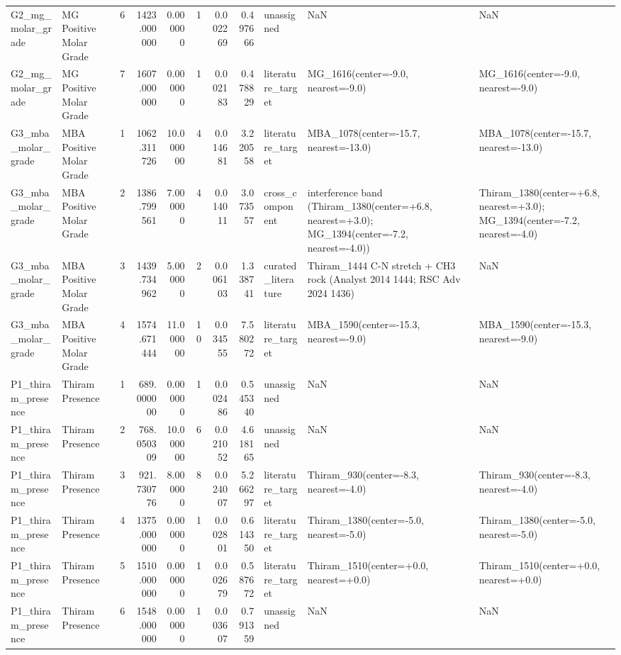 \begin{tabular}{llrrrrrrlll}
G2_mg_molar_grade & MG Positive Molar Grade & 6 & 1423.000000 & 0.000000 & 1 & 0.002269 & 0.497666 & unassigned & NaN & NaN \\
G2_mg_molar_grade & MG Positive Molar Grade & 7 & 1607.000000 & 0.000000 & 1 & 0.002183 & 0.478829 & literature_target & MG_1616(center=-9.0, nearest=-9.0) & MG_1616(center=-9.0, nearest=-9.0) \\
G3_mba_molar_grade & MBA Positive Molar Grade & 1 & 1062.311726 & 10.000000 & 4 & 0.014681 & 3.220558 & literature_target & MBA_1078(center=-15.7, nearest=-13.0) & MBA_1078(center=-15.7, nearest=-13.0) \\
G3_mba_molar_grade & MBA Positive Molar Grade & 2 & 1386.799561 & 7.000000 & 4 & 0.014011 & 3.073557 & cross_component & interference band (Thiram_1380(center=+6.8, nearest=+3.0); MG_1394(center=-7.2, nearest=-4.0)) & Thiram_1380(center=+6.8, nearest=+3.0); MG_1394(center=-7.2, nearest=-4.0) \\
G3_mba_molar_grade & MBA Positive Molar Grade & 3 & 1439.734962 & 5.000000 & 2 & 0.006103 & 1.338741 & curated_literature & Thiram_1444 C-N stretch + CH3 rock (Analyst 2014 1444; RSC Adv 2024 1436) & NaN \\
G3_mba_molar_grade & MBA Positive Molar Grade & 4 & 1574.671444 & 11.000000 & 10 & 0.034555 & 7.580272 & literature_target & MBA_1590(center=-15.3, nearest=-9.0) & MBA_1590(center=-15.3, nearest=-9.0) \\
P1_thiram_presence & Thiram Presence & 1 & 689.000000 & 0.000000 & 1 & 0.002486 & 0.545340 & unassigned & NaN & NaN \\
P1_thiram_presence & Thiram Presence & 2 & 768.050309 & 10.000000 & 6 & 0.021052 & 4.618165 & unassigned & NaN & NaN \\
P1_thiram_presence & Thiram Presence & 3 & 921.730776 & 8.000000 & 8 & 0.024007 & 5.266297 & literature_target & Thiram_930(center=-8.3, nearest=-4.0) & Thiram_930(center=-8.3, nearest=-4.0) \\
P1_thiram_presence & Thiram Presence & 4 & 1375.000000 & 0.000000 & 1 & 0.002801 & 0.614350 & literature_target & Thiram_1380(center=-5.0, nearest=-5.0) & Thiram_1380(center=-5.0, nearest=-5.0) \\
P1_thiram_presence & Thiram Presence & 5 & 1510.000000 & 0.000000 & 1 & 0.002679 & 0.587672 & literature_target & Thiram_1510(center=+0.0, nearest=+0.0) & Thiram_1510(center=+0.0, nearest=+0.0) \\
P1_thiram_presence & Thiram Presence & 6 & 1548.000000 & 0.000000 & 1 & 0.003607 & 0.791359 & unassigned & NaN & NaN \\

\end{tabular}
